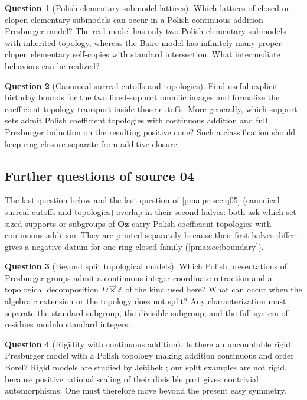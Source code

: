 \documentclass[11pt]{article}
\numberwithin{equation}{section}
\theoremstyle{definition}
\newtheorem{question}[question]{Question}
\theoremstyle{remark}
\newcommand{\Z}{\mathbb Z}
\newcommand{\Oz}{\mathbf{Oz}}
\newcommand{\lex}{\mathbin{\overrightarrow\times}}
\begin{document}
\begin{question}[Polish elementary-submodel lattices]
Which lattices of closed or clopen elementary submodels can occur in a
Polish continuous-addition Presburger model? The real model has only two
Polish elementary submodels with inherited topology, whereas the Baire
model has infinitely many proper clopen elementary self-copies with
standard intersection. What intermediate behaviors can be realized?
\end{question}

\begin{question}[Canonical surreal cutoffs and topologies]
Find useful explicit birthday bounds for the two fixed-support omnific
images and formalize the coefficient-topology transport inside those
cutoffs. More generally, which support sets admit Polish coefficient
topologies with continuous addition and full Presburger induction on
the resulting positive cone? Such a classification should keep ring
closure separate from additive closure.
\end{question}

\subsection{Further questions of source 04}\label{pma:pr:sec:q04}

The last question below and the last question of \cref{pma:pr:sec:q05}
(canonical surreal cutoffs and topologies) overlap in their second halves:
both ask which set-sized supports or subgroups of $\Oz$ carry Polish
coefficient topologies with continuous addition. They are printed separately
because their first halves differ.  gives a negative
datum for one ring-closed family (\cref{pma:sec:boundary}).

\begin{question}[Beyond split topological models]
Which Polish presentations of Presburger groups admit a continuous
integer-coordinate retraction and a topological decomposition
$D\lex\Z$ of the kind used here? What can occur when the algebraic
extension or the topology does not split? Any characterization must
separate the standard subgroup, the divisible subgroup, and the full
system of residues modulo standard integers.
\end{question}

\begin{question}[Rigidity with continuous addition]
Is there an uncountable rigid Presburger model with a Polish topology making
addition continuous and order Borel? Rigid models are studied by
Je\v r\'abek \cite{jerabek}; our split examples are not rigid, because
positive rational scaling of their divisible part gives nontrivial
automorphisms. One must therefore move beyond the present easy symmetry.
\end{question}
\end{document}
